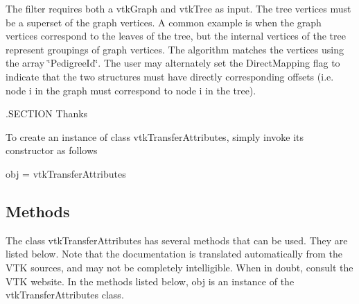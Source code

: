 The filter requires both a vtk\-Graph and vtk\-Tree as input. The tree vertices must be a superset of the graph vertices. A common example is when the graph vertices correspond to the leaves of the tree, but the internal vertices of the tree represent groupings of graph vertices. The algorithm matches the vertices using the array \char`\"{}\-Pedigree\-Id\char`\"{}. The user may alternately set the Direct\-Mapping flag to indicate that the two structures must have directly corresponding offsets (i.\-e. node i in the graph must correspond to node i in the tree).

.S\-E\-C\-T\-I\-O\-N Thanks

To create an instance of class vtk\-Transfer\-Attributes, simply invoke its constructor as follows \begin{DoxyVerb}  obj = vtkTransferAttributes
\end{DoxyVerb}
 \hypertarget{vtkwidgets_vtkxyplotwidget_Methods}{}\subsection{Methods}\label{vtkwidgets_vtkxyplotwidget_Methods}
The class vtk\-Transfer\-Attributes has several methods that can be used. They are listed below. Note that the documentation is translated automatically from the V\-T\-K sources, and may not be completely intelligible. When in doubt, consult the V\-T\-K website. In the methods listed below, {\ttfamily obj} is an instance of the vtk\-Transfer\-Attributes class. 
